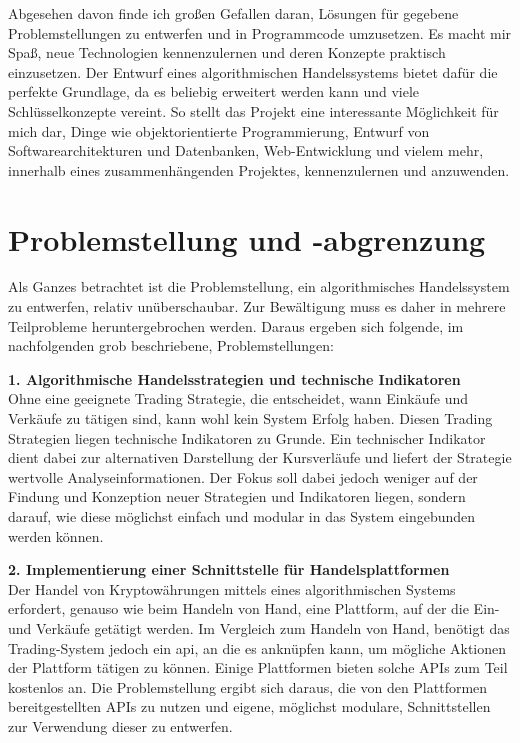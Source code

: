\documentclass[oneside]{ausarbeitung}
\begin{document}
Abgesehen davon finde ich großen Gefallen daran, Lösungen für
gegebene Problemstellungen zu entwerfen und in Programmcode
umzusetzen. Es macht mir Spaß, neue Technologien kennenzulernen und
deren Konzepte praktisch einzusetzen. Der Entwurf eines
algorithmischen Handelssystems bietet dafür die perfekte Grundlage,
da es beliebig erweitert werden kann und viele Schlüsselkonzepte
vereint. So stellt das Projekt eine interessante Möglichkeit für
mich dar, Dinge wie objektorientierte Programmierung, Entwurf von
Softwarearchitekturen und Datenbanken, Web-Entwicklung und vielem
mehr, innerhalb eines zusammenhängenden Projektes, kennenzulernen und
anzuwenden.


\section{Problemstellung und -abgrenzung}
\label{sec:problemstellung}

Als Ganzes betrachtet ist die Problemstellung, ein algorithmisches
Handelssystem zu entwerfen, relativ unüberschaubar. Zur Bewältigung
muss es daher in mehrere Teilprobleme heruntergebrochen werden. Daraus
ergeben sich folgende, im nachfolgenden grob beschriebene,
Problemstellungen:

\textbf{1. Algorithmische Handelsstrategien und technische Indikatoren} \\
Ohne eine geeignete Trading Strategie, die entscheidet, wann Einkäufe
und Verkäufe zu tätigen sind, kann wohl kein System Erfolg haben.
Diesen Trading Strategien liegen technische Indikatoren zu Grunde. Ein
technischer Indikator dient dabei zur alternativen Darstellung der
Kursverläufe und liefert der Strategie wertvolle Analyseinformationen.
Der Fokus soll dabei jedoch weniger auf der Findung und Konzeption
neuer Strategien und Indikatoren liegen, sondern darauf, wie diese
möglichst einfach und modular in das System eingebunden werden
können.

\textbf{2. Implementierung einer Schnittstelle für Handelsplattformen} \\
Der Handel von Kryptowährungen mittels eines algorithmischen Systems
erfordert, genauso wie beim Handeln von Hand, eine Plattform, auf der
die Ein- und Verkäufe getätigt werden. Im Vergleich zum Handeln von
Hand, benötigt das Trading-System jedoch ein \ac{api}, an die es
anknüpfen kann, um mögliche Aktionen der Plattform tätigen zu
können. Einige Plattformen bieten solche APIs zum Teil kostenlos an.
Die Problemstellung ergibt sich daraus, die von den Plattformen
bereitgestellten APIs zu nutzen und eigene, möglichst modulare,
Schnittstellen zur Verwendung dieser zu entwerfen.
\end{document}
